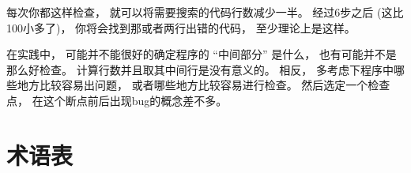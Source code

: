 每次你都这样检查， 就可以将需要搜索的代码行数减少一半。 经过6步之后 (这比100小多了)， 你将会找到那或者两行出错的代码， 至少理论上是这样。


在实践中， 可能并不能很好的确定程序的 ``中间部分'' 是什么， 也有可能并不是那么好检查。
计算行数并且取其中间行是没有意义的。 相反， 多考虑下程序中哪些地方比较容易出问题， 或者哪些地方比较容易进行检查。 然后选定一个检查点， 在这个断点前后出现bug的概念差不多。

\section{术语表}

